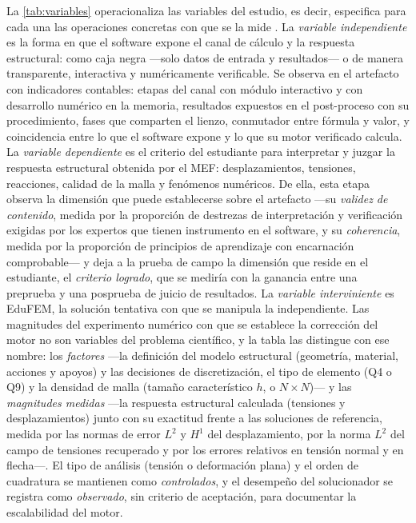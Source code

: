 La \autoref{tab:variables} operacionaliza las variables del estudio, es decir, especifica para cada una las operaciones concretas con que se la mide \autocite[p.~137]{sampieri2018metodologia}. La \emph{variable independiente} es la forma en que el software expone el canal de cálculo y la respuesta estructural: como caja negra —solo datos de entrada y resultados— o de manera transparente, interactiva y numéricamente verificable. Se observa en el artefacto con indicadores contables: etapas del canal con módulo interactivo y con desarrollo numérico en la memoria, resultados expuestos en el post-proceso con su procedimiento, fases que comparten el lienzo, conmutador entre fórmula y valor, y coincidencia entre lo que el software expone y lo que su motor verificado calcula. La \emph{variable dependiente} es el criterio del estudiante para interpretar y juzgar la respuesta estructural obtenida por el MEF: desplazamientos, tensiones, reacciones, calidad de la malla y fenómenos numéricos. De ella, esta etapa observa la dimensión que puede establecerse sobre el artefacto —su \emph{validez de contenido}, medida por la proporción de destrezas de interpretación y verificación exigidas por los expertos que tienen instrumento en el software, y su \emph{coherencia}, medida por la proporción de principios de aprendizaje con encarnación comprobable— y deja a la prueba de campo la dimensión que reside en el estudiante, el \emph{criterio logrado}, que se mediría con la ganancia entre una preprueba y una posprueba de juicio de resultados. La \emph{variable interviniente} es EduFEM, la solución tentativa con que se manipula la independiente. Las magnitudes del experimento numérico con que se establece la corrección del motor no son variables del problema científico, y la tabla las distingue con ese nombre: los \emph{factores} —la definición del modelo estructural (geometría, material, acciones y apoyos) y las decisiones de discretización, el tipo de elemento (Q4 o Q9) y la densidad de malla (tamaño característico $h$, o $N\times N$)— y las \emph{magnitudes medidas} —la respuesta estructural calculada (tensiones y desplazamientos) junto con su exactitud frente a las soluciones de referencia, medida por las normas de error $L^2$ y $H^1$ del desplazamiento, por la norma $L^2$ del campo de tensiones recuperado y por los errores relativos en tensión normal y en flecha—. El tipo de análisis (tensión o deformación plana) y el orden de cuadratura se mantienen como \emph{controlados}, y el desempeño del solucionador se registra como \emph{observado}, sin criterio de aceptación, para documentar la escalabilidad del motor.


